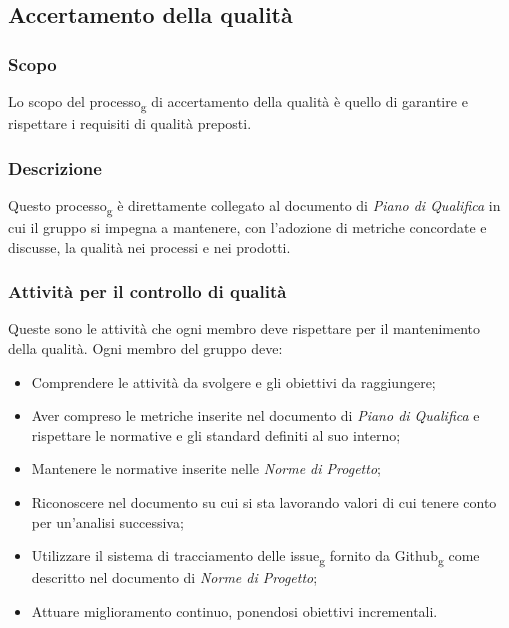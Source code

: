 \subsection{Accertamento della qualità}

\subsubsection{Scopo}
Lo scopo del processo\textsubscript{g} di accertamento della qualità è quello di garantire e rispettare i requisiti di qualità preposti.
\subsubsection{Descrizione}
Questo processo\textsubscript{g} è direttamente collegato al documento di \textit{Piano di Qualifica} in cui il gruppo si impegna a mantenere, con l'adozione di metriche concordate e discusse, la qualità nei processi e nei prodotti.
\subsubsection{Attività per il controllo di qualità}
Queste sono le attività che ogni membro deve rispettare per il mantenimento della qualità.
Ogni membro del gruppo deve:
\begin{itemize}
\item Comprendere le attività da svolgere e gli obiettivi da raggiungere;
\item Aver compreso le metriche inserite nel documento di \textit{Piano di Qualifica} e rispettare le normative e gli standard definiti al suo interno;
\item Mantenere le normative inserite nelle \textit{Norme di Progetto};
\item Riconoscere nel documento su cui si sta lavorando valori di cui tenere conto per un'analisi successiva;
\item Utilizzare il sistema di tracciamento delle issue\textsubscript{g} fornito da Github\textsubscript{g} come descritto nel documento di \textit{Norme di Progetto};
\item Attuare miglioramento continuo, ponendosi obiettivi incrementali.
\end{itemize}
